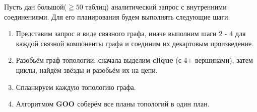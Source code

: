 \documentclass[12pt]{article}
\begin{document}
\begin{flushleft}
Пусть дан большой($\geqq 50$ таблиц) аналитический запрос с внутренними соединениями. Для его планирования будем выполнять 
следующие шаги:
\begin{enumerate}
    \item Представим запрос в виде связного графа, иначе выполним шаги 2 - 4 для каждой связной компоненты графа и соединим 
их декартовым произведение.
    \item Разобьём граф топологии: сначала выделим \textbf{clique} (с 4+ вершинами), затем циклы, найдём звёзды и разобьём их на цепи.
    \item Спланируем каждую топологию графа.
    \item Алгоритмом \textbf{GOO \cite[стр. 108]{Thomas} \cite{Allam}} соберём все планы топологий в один план.
    


\end{enumerate}
\centering 

\raggedright

\end{flushleft}
\end{document}
